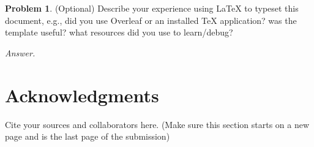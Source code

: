 \documentclass[12pt]{article}
\theoremstyle{definition}
\newtheorem{question}{Problem}
\begin{document}
\newpage

\begin{question} {(Optional)}
Describe your experience using \LaTeX{} to typeset this document, e.g., did you use Overleaf or an installed \TeX{} application? 
was the template useful? what resources did you use to learn/debug?
\end{question}


\emph{Answer.}

\newpage
\section*{Acknowledgments}
Cite your sources and collaborators here.  (Make sure this section starts on a new page and is the last page of the submission)
\end{document}
